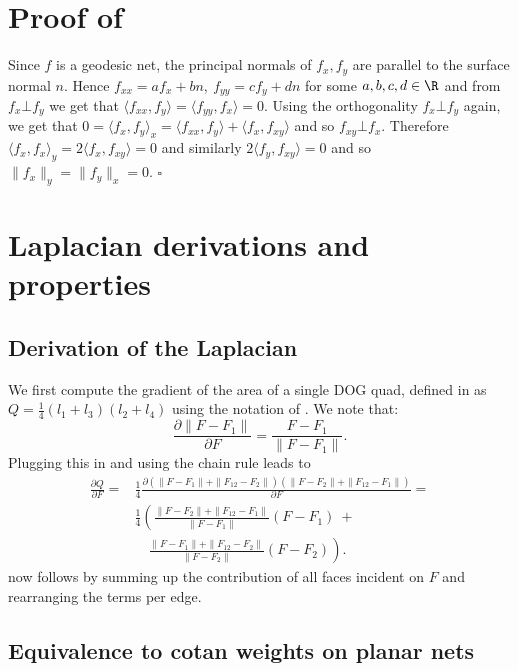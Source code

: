 \section{Proof of } \label{app:og_is_cheb}
Since $f$ is a geodesic net, the principal normals of $f_x,f_y$ are parallel to the surface normal $n$. Hence $f_{xx} = af_x+bn, \  f_{yy} = cf_y +dn$ for some $a,b,c,d \in {\R}$ and from $f_x \bot f_y$ we get that $\langle f_{xx},f_y \rangle = \langle f_{yy},f_x \rangle = 0$. Using the orthogonality $f_x \bot f_y$ again, we get that $0 = \langle f_x,f_y \rangle_x = \langle f_{xx},f_y \rangle + \langle f_x,f_{xy} \rangle$ and so $f_{xy} \bot f_x$. Therefore $\langle f_x, f_x\rangle_y = 2\langle f_x,f_{xy} \rangle = 0$ and similarly $2\langle f_y,f_{xy} \rangle = 0$ and so $\|f_x\|_y=\|f_y\|_x=0$. \hfill$\square$

\section{Laplacian derivations and properties}

\subsection{Derivation of the Laplacian} \label{app:laplace_derivation}
We first compute the gradient of the area of a single DOG quad, defined in  as $Q = \frac{1}{4}(l_1+l_3)(l_2 + l_4)$ using the notation of . We note that:
\begin{equation}
\frac{\partial\|F-F_1\|}{\partial F} = \frac{F-F_1}{\|F-F_1\|}.
\end{equation}
Plugging this in and using the chain rule leads to
\begin{equation} \label{eq:vertex_area_diff}
\begin{split}
\frac{\partial Q}{\partial F} = &\frac{1}{4}\frac{\partial(\|F-F_1\|+\|F_{12}-F_2\|)(\|F-F_2\|+\|F_{12}-F_1\|)}{\partial F} = \\
&\frac{1}{4}\left(\frac{\|F-F_2\|+\|F_{12}-F_1\|}{\|F-F_1\|}(F-F_1) \ + \right.\\
& \quad \left.\frac{\|F-F_1\|+\|F_{12}-F_2\|}{\|F-F_2\|}(F-F_2)\right).
\end{split}
\end{equation}
 now follows by summing up the contribution of all faces incident on $F$ and rearranging the terms per edge. 

\subsection{Equivalence to cotan weights on planar nets} \label{app:laplace_linear_precision}

